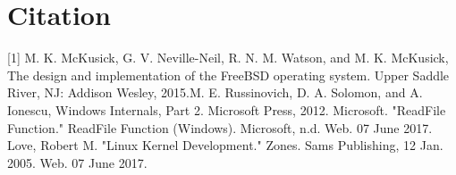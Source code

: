\documentclass{article}
\begin{document}
\section{Citation}
    [1] M. K. McKusick, G. V. Neville-Neil, R. N. M. Watson, and M. K. McKusick, The design and implementation of the FreeBSD operating system. Upper Saddle River, NJ: Addison Wesley, 2015.\newline \newline
    [2] M. E. Russinovich, D. A. Solomon, and A. Ionescu, Windows Internals, Part 2. Microsoft Press, 2012. \newline \newline
    [3] Microsoft. "ReadFile Function." ReadFile Function (Windows). Microsoft, n.d. Web. 07 June 2017. \newline \newline
    [4] Love, Robert M. "Linux Kernel Development." Zones. Sams Publishing, 12 Jan. 2005. Web. 07 June 2017.
\end{document}
